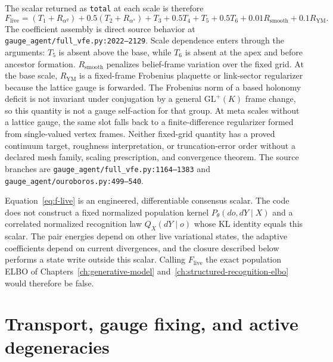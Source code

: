 The scalar returned as \texttt{total} at each scale is therefore
\begin{equation}
 \boxed{
 F_{\mathrm{live}}
 =(T_1+R_{\alpha^q})+0.5(T_2+R_{\alpha^s})+T_3+0.5T_4+T_5
 +0.5T_6+0.01R_{\mathrm{smooth}}+0.1R_{\mathrm{YM}}.}
 \label{eq:f-live}
\end{equation}
The coefficient assembly is direct source behavior at \texttt{gauge\_agent/full\_vfe.py:2022--2129}. Scale dependence enters through the arguments: $T_5$ is absent above the base, while $T_6$ is absent at the apex and before ancestor formation. $R_{\mathrm{smooth}}$ penalizes belief-frame variation over the fixed grid. At the base scale, $R_{\mathrm{YM}}$ is a fixed-frame Frobenius plaquette or link-sector regularizer because the lattice gauge is forwarded. The Frobenius norm of a based holonomy deficit is not invariant under conjugation by a general $\mathrm{GL}^{+}(K)$ frame change, so this quantity is not a gauge self-action for that group. At meta scales without a lattice gauge, the same slot falls back to a finite-difference regularizer formed from single-valued vertex frames. Neither fixed-grid quantity has a proved continuum target, roughness interpretation, or truncation-error order without a declared mesh family, scaling prescription, and convergence theorem. The source branches are \texttt{gauge\_agent/full\_vfe.py:1164--1383} and \texttt{gauge\_agent/ouroboros.py:499--540}.

Equation~\eqref{eq:f-live} is an engineered, differentiable consensus scalar. The code does not construct a fixed normalized population kernel $P_\theta(do,dY\mid X)$ and a correlated normalized recognition law $Q_X(dY\mid o)$ whose KL identity equals this scalar. The pair energies depend on other live variational states, the adaptive coefficients depend on current divergences, and the closure described below performs a state write outside this scalar. Calling $F_{\mathrm{live}}$ the exact population ELBO of Chapters~\ref{ch:generative-model} and~\ref{ch:structured-recognition-elbo} would therefore be false.

\section{Transport, gauge fixing, and active degeneracies}

